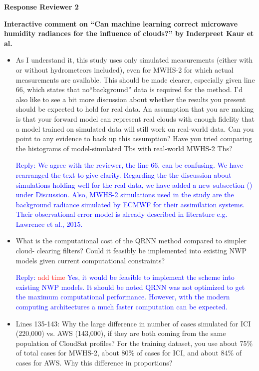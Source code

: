 \documentclass[11pt,a4paper,draft]{article}
\begin{document}
\textbf{Response Reviewer 2}

\textbf{
	Interactive comment on ``Can machine learning
	correct microwave humidity radiances for the
	influence of clouds?'' by Inderpreet Kaur et al.}

\begin{itemize}

\item 			
			As I understand it, this study uses only simulated measurements (either with or without hydrometeors included), even for MWHS-2 for which actual measurements are available. This should be made clearer, especially given line 66, which states that no``background'' data is required for the method. I'd also like to see a bit more discussion 	about whether the results you present should be expected to hold for real data. An assumption that you are making is that your forward model can represent real clouds with enough fidelity that a model trained on simulated data will still work on real-world data. Can you point to any evidence to back up this assumption? Have you tried comparing the histograms of model-simulated Tbs with real-world MWHS-2 Tbs?

\textcolor{blue}{Reply: We agree with the reviewer, the line 66, can be confusing. We have rearranged the text to give clarity.
Regarding the the discussion about simulations holding well for the real-data, we have added a new subsection () under Discussion.
Also, MWHS-2 simulations used in the study are the background radiance simulated by ECMWF for their assimilation systems. Their observational error model is already described in literature e.g. Lawrence et al., 2015. }

		
\item  	
			What is the computational cost of the QRNN method compared to simpler cloud-
			clearing filters? Could it feasibly be implemented into existing NWP models given
			current computational constraints?

\textcolor{blue}{Reply: \textcolor{red}{add time} Yes, it would be feasible to implement the scheme into existing NWP models. It should be noted QRNN was not optimized to get the maximum computational performance. However, with the modern computing architectures a much faster computation can be expected. }

\item  
			Lines 135-143: Why the large difference in number of cases simulated for ICI (220,000)
			vs. AWS (143,000), if they are both coming from the same population of CloudSat
			profiles? For the training dataset, you use about 75\% of total cases for MWHS-2,
			about 80\% of cases for ICI, and about 84\% of cases for AWS. Why this difference in
			proportions?


\end{itemize}
\end{document}
